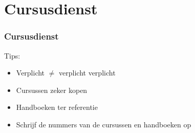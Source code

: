 \section{Cursusdienst}
\begin{frame}[allowframebreaks=10]
	\frametitle{Cursusdienst}
    \vspace{0.5cm}
    
    Tips:
    \begin{itemize}
        \item Verplicht $\neq$ verplicht verplicht
        \item Cursussen zeker kopen
        \item Handboeken ter referentie
        \item Schrijf de nummers van de cursussen en handboeken op
	\end{itemize}
    


\end{frame}
